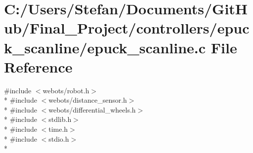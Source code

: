 \section{C\-:/\-Users/\-Stefan/\-Documents/\-Git\-Hub/\-Final\-\_\-\-Project/controllers/epuck\-\_\-scanline/epuck\-\_\-scanline.c File Reference}
\label{epuck__scanline_8c}
{\ttfamily \#include $<$webots/robot.\-h$>$}\\*
{\ttfamily \#include $<$webots/distance\-\_\-sensor.\-h$>$}\\*
{\ttfamily \#include $<$webots/differential\-\_\-wheels.\-h$>$}\\*
{\ttfamily \#include $<$stdlib.\-h$>$}\\*
{\ttfamily \#include $<$time.\-h$>$}\\*
{\ttfamily \#include $<$stdio.\-h$>$}\\*
